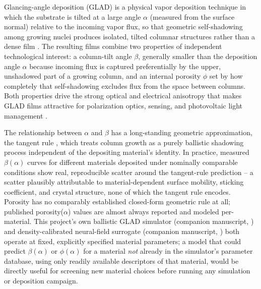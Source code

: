 \documentclass[aip,amsmath,amssymb,reprint]{revtex4-1}
\begin{document}
Glancing-angle deposition (GLAD) is a physical vapor deposition
technique in which the substrate is tilted at a large angle
$\alpha$ (measured from the surface normal) relative to the incoming
vapor flux, so that geometric self-shadowing among growing nuclei
produces isolated, tilted columnar structures rather than a dense
film \citep{robbie1997,hawkeye2007,hawkeye2014}. The resulting films
combine two properties of independent technological interest: a
column-tilt angle $\beta$, generally smaller than the deposition angle
$\alpha$ because incoming flux is captured preferentially by the
upper, unshadowed part of a growing column, and an internal porosity
$\phi$ set by how completely that self-shadowing excludes flux from
the space between columns. Both properties drive the strong optical
and electrical anisotropy that makes GLAD films attractive for
polarization optics, sensing, and photovoltaic light management
\citep{brett2008science,lakhtakia2005stf,messier2000origin}.

The relationship between $\alpha$ and $\beta$ has a long-standing
geometric approximation, the tangent rule
\citep{tait1993modelling,thornton1974}, which treats column growth as
a purely ballistic shadowing process independent of the depositing
material's identity. In practice, measured $\beta(\alpha)$ curves for
different materials deposited under nominally comparable conditions
show real, reproducible scatter around the tangent-rule prediction
\citep{chaffar2018,chaffar2019,tounsi2015,benamor2026,%
benNacer2020cu2oGlad} -- a scatter plausibly attributable to
material-dependent surface mobility, sticking coefficient, and
crystal structure, none of which the tangent rule encodes. Porosity
has no comparably established closed-form geometric rule at all;
published porosity($\alpha$) values are almost always reported and
modeled per-material. This project's own ballistic GLAD simulator
(companion manuscript, \citealp{companionP1}) and density-calibrated
neural-field surrogate (companion manuscript, \citealp{companionP2})
both operate at fixed, explicitly specified material parameters; a
model that could predict $\beta(\alpha)$ or $\phi(\alpha)$ for a
material \emph{not} already in the simulator's parameter database,
using only readily available descriptors of that material, would be
directly useful for screening new material choices before running any
simulation or deposition campaign.
\end{document}
